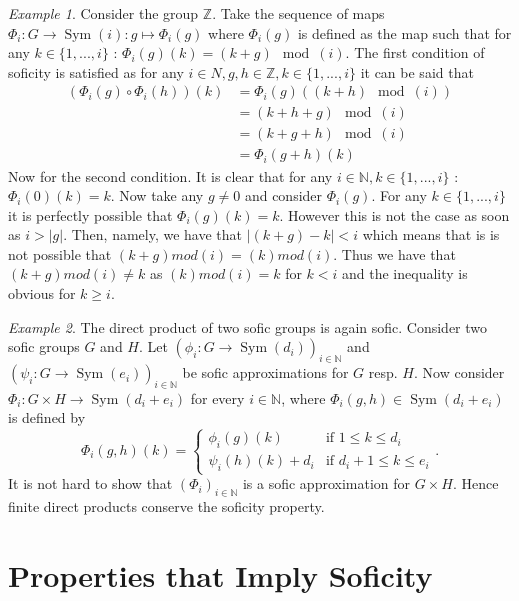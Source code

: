 \documentclass[titlepage, a4paper]{article}
\newcommand{\N}{\mathbb{N}}
\newcommand{\Z}{\mathbb{Z}}
\DeclareMathOperator{\sym}{Sym}
\theoremstyle{remark}
\newtheorem{example}{Example}
\begin{document}
	\begin{example}\label{ex:Z}
	Consider the group $\Z$. Take the sequence of maps $\Phi_{i}: G \to \sym(i): g \mapsto \Phi_{i}(g)$ where $\Phi_{i}(g)$ is defined as the map such that for any $k \in \{1,...,i\}$ : $ \Phi_{i}(g)(k) = (k+g) \mod(i)$. The first condition of soficity is satisfied as for any $i \in N, g,h \in \Z, k \in \{1,..., i\}$ it can be said that 
	\begin{align*}
	(\Phi_{i}(g) \circ \Phi_{i}(h))(k) &= \Phi_{i}(g)((k+h)\mod(i))\\
	&= (k+h+g)\mod(i)\\
	&= (k+g+h)\mod(i)\\
	&= \Phi_{i}(g+h)(k)
\end{align*}		
	Now for the second condition. It is clear that for any $i \in \N, k \in \{1,..., i\}$ : $\Phi_{i}(0)(k) = k$. Now take any $g \neq 0$ and consider $\Phi_{i}(g)$. For any $k \in \{1,...,i\}$ it is perfectly possible that $\Phi_{i}(g)(k) = k$. However this is not the case as soon as $i > |g|$. Then, namely, we have that $|(k+g)-k| < i$ which means that is is not possible that $(k+g)mod(i) = (k)mod(i)$. Thus we have that $(k+g)mod(i) \neq k$ as $(k)mod(i) = k$ for $k<i$ and the inequality is obvious for $k \geq i$.
	\end{example}

    \begin{example}\label{ex:direct_product_sofic}
        The direct product of two sofic groups is again sofic. Consider two sofic groups $G$ and $H$. Let $(\phi_i: G \to \sym(d_i))_{i \in \N}$ and $(\psi_i: G \to \sym(e_i))_{i \in \N}$ be sofic approximations for $G$ resp. $H$. Now consider $\Phi_i : G \times H \to \sym(d_i+e_i)$ for every $i \in \N$, where $\Phi_i(g, h) \in \sym(d_i+e_i)$ is defined by
        \[
            \Phi_i(g,h)(k) = \begin{cases} \phi_i(g)(k) & \text{if } 1 \leq k \leq d_i \\
            \psi_i(h)(k)+d_i & \text{if } d_i + 1 \leq k \leq e_i
            \end{cases}.
        \]
        It is not hard to show that $(\Phi_i)_{i \in \N}$ is a sofic approximation for $G \times H$. %
        Hence finite direct products conserve the soficity property.
    \end{example}


    \section{Properties that Imply Soficity}
\end{document}
